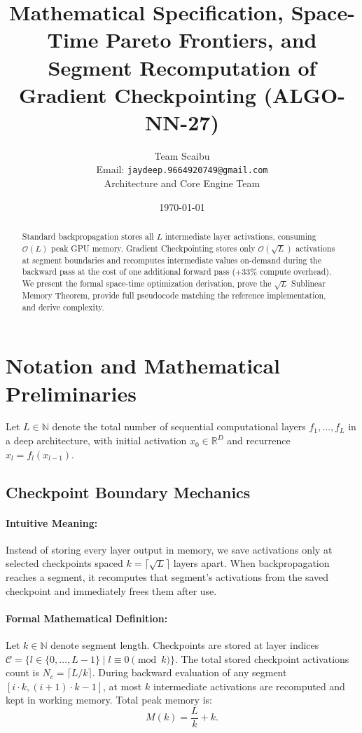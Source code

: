 \documentclass[11pt]{article}
\title{\textbf{Mathematical Specification, Space-Time Pareto Frontiers, and Segment Recomputation of Gradient Checkpointing (ALGO-NN-27)}}
\author{Team Scaibu \\ \small Email: \texttt{jaydeep.9664920749@gmail.com} \\ \small Architecture and Core Engine Team}
\date{\today}
\begin{document}
\maketitle

\begin{abstract}
Standard backpropagation stores all $L$ intermediate layer activations, consuming $\mathcal{O}(L)$ peak GPU memory. Gradient Checkpointing stores only $\mathcal{O}(\sqrt{L})$ activations at segment boundaries and recomputes intermediate values on-demand during the backward pass at the cost of one additional forward pass ($+33\%$ compute overhead). We present the formal space-time optimization derivation, prove the $\sqrt{L}$ Sublinear Memory Theorem, provide full pseudocode matching the reference implementation, and derive complexity.
\end{abstract}

\section{Notation and Mathematical Preliminaries}
\label{sec:notation}

Let $L \in \mathbb{N}$ denote the total number of sequential computational layers $f_1, \dots, f_L$ in a deep architecture, with initial activation $x_0 \in \mathbb{R}^D$ and recurrence $x_l = f_l(x_{l-1})$.

\subsection{Checkpoint Boundary Mechanics}
\paragraph{Intuitive Meaning:} Instead of storing every layer output in memory, we save activations only at selected checkpoints spaced $k = \lceil\sqrt{L}\rceil$ layers apart. When backpropagation reaches a segment, it recomputes that segment's activations from the saved checkpoint and immediately frees them after use.

\paragraph{Formal Mathematical Definition:}
Let $k \in \mathbb{N}$ denote segment length. Checkpoints are stored at layer indices $\mathcal{C} = \{l \in \{0, \dots, L-1\} \mid l \equiv 0 \pmod k\}$.
The total stored checkpoint activations count is $N_c = \lceil L / k \rceil$.
During backward evaluation of any segment $[i \cdot k, (i+1) \cdot k - 1]$, at most $k$ intermediate activations are recomputed and kept in working memory.
Total peak memory is:
\begin{equation}
\label{eq:mem_objective}
M(k) = \frac{L}{k} + k.
\end{equation}
\end{document}
